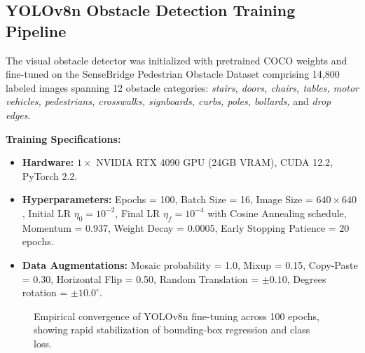 \documentclass[conference]{IEEEtran}
\begin{document}
\subsection{YOLOv8n Obstacle Detection Training Pipeline}
The visual obstacle detector was initialized with pretrained COCO weights and fine-tuned on the SenseBridge Pedestrian Obstacle Dataset comprising 14,800 labeled images spanning 12 obstacle categories: \textit{stairs, doors, chairs, tables, motor vehicles, pedestrians, crosswalks, signboards, curbs, poles, bollards,} and \textit{drop edges}.

\textbf{Training Specifications:}
\begin{itemize}
    \item \textbf{Hardware:} $1\times$ NVIDIA RTX 4090 GPU (24GB VRAM), CUDA 12.2, PyTorch 2.2.
    \item \textbf{Hyperparameters:} Epochs = 100, Batch Size = 16, Image Size = $640\times 640$, Initial LR $\eta_0 = 10^{-2}$, Final LR $\eta_f = 10^{-4}$ with Cosine Annealing schedule, Momentum = 0.937, Weight Decay = 0.0005, Early Stopping Patience = 20 epochs.
    \item \textbf{Data Augmentations:} Mosaic probability = 1.0, Mixup = 0.15, Copy-Paste = 0.30, Horizontal Flip = 0.50, Random Translation = $\pm 0.10$, Degrees rotation = $\pm 10.0^\circ$.
\end{itemize}

\begin{figure}[htbp]
\centering
{}
\caption{Empirical convergence of YOLOv8n fine-tuning across 100 epochs, showing rapid stabilization of bounding-box regression and class loss.}
\label{fig:yolo_train}
\end{figure}
\end{document}
